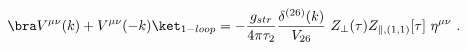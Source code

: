 \begin{equation}
  \bra V^{\mu \nu}(k)+  V^{\mu \nu}(-k) \ket_{1-loop} =
 -\frac{g_{str}}{4\pi\tau_2}
 \frac{\delta^{(26)}(k)}{V_{26}}~Z_\perp(\tau)
 Z_{\parallel, (1,1)}[\tau]~\eta^{\mu\nu} \ .
\end{equation}

